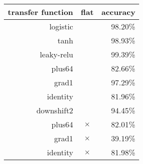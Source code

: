 \begin{tabular}{rcr}
{\bf transfer function} & {\bf flat} & {\bf accuracy} \\
\hline 
logistic &   & 98.20\% \\
tanh &   & 98.93\% \\
leaky-relu &   & 99.39\% \\
plus64 &   & 82.66\% \\
grad1 &   & 97.29\% \\
identity &   & 81.96\% \\
downshift2 &   & 94.45\% \\
plus64 & $\times$ & 82.01\% \\
grad1 & $\times$ & 39.19\% \\
identity & $\times$ & 81.98\% \\
\end{tabular}
